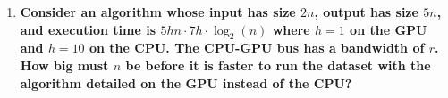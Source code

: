 \begin{enumerate}
%
%
%
%
%





\item \textbf{Consider an algorithm whose input has size $2n$, output has size $5n$, and execution time is $5hn \cdot 7h \cdot \log_2(n)$ where $h = 1$ on the GPU and $h = 10$ on the CPU. The CPU-GPU bus has a bandwidth of $r$. How big must $n$ be before it is faster to run the dataset with the algorithm detailed on the GPU instead of the CPU?}



\end{enumerate}

